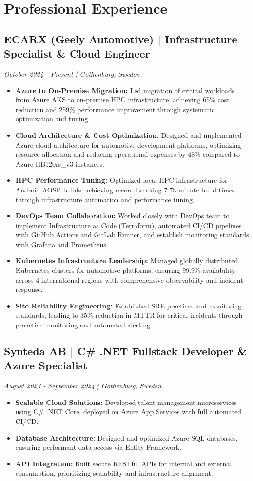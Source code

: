 \documentclass[11pt,a4paper]{article}
\begin{document}
\section*{Professional Experience}
\subsection*{ECARX (Geely Automotive) | Infrastructure Specialist \& Cloud Engineer}
\textit{October 2024 - Present | Gothenburg, Sweden}
\begin{itemize}[noitemsep]
\item \textbf{Azure to On-Premise Migration:} Led migration of critical workloads from Azure AKS to on-premise HPC infrastructure, achieving 65\% cost reduction and 259\% performance improvement through systematic optimization and tuning.
\item \textbf{Cloud Architecture \& Cost Optimization:} Designed and implemented Azure cloud architecture for automotive development platforms, optimizing resource allocation and reducing operational expenses by 48\% compared to Azure HB120rs\_v3 instances.
\item \textbf{HPC Performance Tuning:} Optimized local HPC infrastructure for Android AOSP builds, achieving record-breaking 7.78-minute build times through infrastructure automation and performance tuning.
\item \textbf{DevOps Team Collaboration:} Worked closely with DevOps team to implement Infrastructure as Code (Terraform), automated CI/CD pipelines with GitHub Actions and GitLab Runner, and establish monitoring standards with Grafana and Prometheus.
\item \textbf{Kubernetes Infrastructure Leadership:} Managed globally distributed Kubernetes clusters for automotive platforms, ensuring 99.9\% availability across 4 international regions with comprehensive observability and incident response.
\item \textbf{Site Reliability Engineering:} Established SRE practices and monitoring standards, leading to 35\% reduction in MTTR for critical incidents through proactive monitoring and automated alerting.
\end{itemize}

\subsection*{Synteda AB | C\# .NET Fullstack Developer \& Azure Specialist}
\textit{August 2023 - September 2024 | Gothenburg, Sweden}
\begin{itemize}[noitemsep]
\item \textbf{Scalable Cloud Solutions:} Developed talent management microservices using C\# .NET Core, deployed on Azure App Services with full automated CI/CD.
\item \textbf{Database Architecture:} Designed and optimized Azure SQL databases, ensuring performant data access via Entity Framework.
\item \textbf{API Integration:} Built secure RESTful APIs for internal and external consumption, prioritizing scalability and infrastructure alignment.
\end{itemize}
\end{document}
